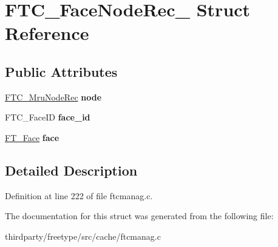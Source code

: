 \hypertarget{struct_f_t_c___face_node_rec__}{}\section{F\+T\+C\+\_\+\+Face\+Node\+Rec\+\_\+ Struct Reference}
\label{struct_f_t_c___face_node_rec__}
\subsection*{Public Attributes}
\begin{DoxyCompactItemize}
\item 
\mbox{\label{struct_f_t_c___face_node_rec___a71ac31f8bcc0764312b68200fb0172bc}} 
\hyperlink{struct_f_t_c___mru_node_rec__}{F\+T\+C\+\_\+\+Mru\+Node\+Rec} {\bfseries node}
\item 
\mbox{\label{struct_f_t_c___face_node_rec___a48b19b2cf2384d5e608e0e115f7dd8f6}} 
F\+T\+C\+\_\+\+Face\+ID {\bfseries face\+\_\+id}
\item 
\mbox{\label{struct_f_t_c___face_node_rec___ae2a8508f8bc0a9e7b5b4f4021addf47f}} 
\hyperlink{struct_f_t___face_rec__}{F\+T\+\_\+\+Face} {\bfseries face}
\end{DoxyCompactItemize}


\subsection{Detailed Description}


Definition at line 222 of file ftcmanag.\+c.



The documentation for this struct was generated from the following file\+:\begin{DoxyCompactItemize}
\item 
thirdparty/freetype/src/cache/ftcmanag.\+c\end{DoxyCompactItemize}
